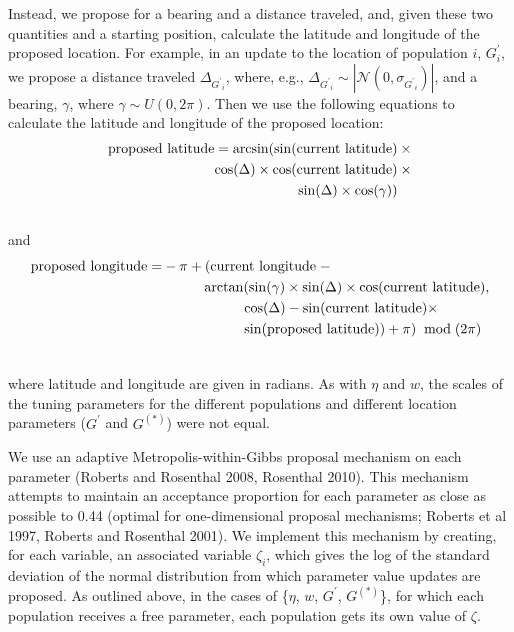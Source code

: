 \documentclass[12pt]{article}
\newcommand{\identifyadmixsource}[1]{{#1^{(*)}}}
\begin{document}
Instead, we propose for a bearing and a distance traveled, and, given these two quantities and a starting position, calculate the latitude and longitude of the proposed location.  For example, in an update to the location of population $i$, $G^{\prime}_i$, we propose a distance traveled $\Delta_{{G^{\prime}}_i}$, where, e.g., $\Delta_{{G^{\prime}}_i}  \sim | \mathcal{N}(0,\sigma_{{G^{\prime}}_i})|$, and a bearing, $\gamma$, where $\gamma \sim U(0,2\pi)$.  Then we use the following equations to calculate the latitude and longitude of the proposed location:
\begin{align}
\text{proposed latitude} = \arcsin(\sin(\text{current latitude}) \: &\times\\  \notag
					\cos(\Delta) \times \cos(\text{current latitude}) \:&\times\\  \notag
					\sin(\Delta) \times \cos(\gamma))   \:&\phantom{\times}\\  \notag
\end{align}
and
\begin{align}
\text{proposed longitude} = & - \pi + (\text{current longitude} \; - \\ \notag
					 	&\hspace{1cm} \arctan(
							\sin(\gamma) \times
							\sin(\Delta) \times
							\cos(\text{current latitude}) , \\ \notag
						& \hspace{2cm} \cos(\Delta) - 
							\sin(\text{current latitude}) \times \\ \notag
						& \hspace{2cm} \sin(\text{proposed latitude})) + \pi) \; \bmod (2\pi) \\ \notag
\end{align}

where latitude and longitude are given in radians.  As with $\eta$ and $w$, the scales of the tuning parameters for the different populations and different location parameters ($G^{\prime}$ and $\identifyadmixsource{G}$) were not equal.

We use an adaptive Metropolis-within-Gibbs proposal mechanism on each parameter (Roberts and Rosenthal 2008, Rosenthal 2010).  This mechanism attempts to maintain an acceptance proportion for each parameter as close as possible to 0.44 (optimal for one-dimensional proposal mechanisms; Roberts et al 1997, Roberts and Rosenthal 2001).  We implement this mechanism by creating, for each variable, an associated variable $\zeta_i$, which gives the log of the standard deviation of the normal distribution from which parameter value updates are proposed.  As outlined above, in the cases of \{$\eta$, $w$, $G^{\prime}$, $\identifyadmixsource{G}$\}, for which each population receives a free parameter, each population gets its own value of $\zeta$.  
\end{document}
